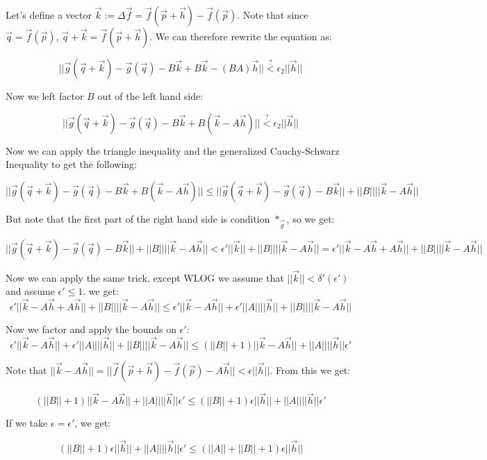 \documentclass[11 pt, twoside]{article}
\begin{document}
Let's define a vector $\vec{k} := \Delta \vec{f} = \vec{f}(\vec{p} + \vec{h}) -
\vec{f}(\vec{p})$. Note that since $\vec{q} = \vec{f}(\vec{p})$, $\vec{q} +
\vec{k} = \vec{f}(\vec{p} + \vec{h})$. We can therefore rewrite the equation as:

\[
||\vec{g}(\vec{q} + \vec{k}) - \vec{g}(\vec{q}) - B\vec{k} + B\vec{k} - (BA) \vec{h}||
\overset{?}{<} \epsilon_2 ||\vec{h}||
\]

Now we left factor $B$ out of the left hand side:

\[
||\vec{g}(\vec{q} + \vec{k}) - \vec{g}(\vec{q}) - B\vec{k} + B(\vec{k} - A
\vec{h})|| \overset{?}{<} \epsilon_2 ||\vec{h}||
\]

Now we can apply the triangle inequality and the generalized Cauchy-Schwarz
Inequality to get the following:

\[
||\vec{g}(\vec{q} + \vec{k}) - \vec{g}(\vec{q}) - B\vec{k} + B(\vec{k} - A
\vec{h})|| \leq ||\vec{g}(\vec{q} + \vec{k}) - \vec{g}(\vec{q}) -
B\vec{k}|| + ||B||||\vec{k} - A\vec{h}||
\]

But note that the first part of the right hand side is condition $*_{\vec{g}}$,
so we get:

\[
||\vec{g}(\vec{q} + \vec{k}) - \vec{g}(\vec{q}) - B\vec{k}|| + ||B||
||\vec{k} - A\vec{h}|| < \epsilon' ||\vec{k}|| + ||B||||\vec{k} -
A\vec{h}|| = \epsilon' ||\vec{k} - A\vec{h} + A\vec{h}|| + ||B||
||\vec{k} - A\vec{h}||
\]

Now we can apply the same trick, except WLOG we assume that $||\vec{k}|| <
\delta'(\epsilon')$ and assume $\epsilon' \leq 1$.  we get:
\[
\epsilon' ||\vec{k} - A\vec{h} + A\vec{h}|| + ||B||
||\vec{k} - A\vec{h}|| \leq \epsilon' ||\vec{k} - A\vec{h}|| +
\epsilon'||A||||\vec{h}|| + ||B||||\vec{k} - A\vec{h}||
\]

Now we factor and apply the bounds on $\epsilon'$:
\[
\epsilon' ||\vec{k} - A\vec{h}|| +
\epsilon'||A||||\vec{h}|| + ||B||||\vec{k} - A\vec{h}|| \leq
(||B|| + 1) ||\vec{k} - A\vec{h}|| + ||A||||\vec{h}||\epsilon'
\]

Note that $||\vec{k} - A\vec{h}|| = ||\vec{f}(\vec{p} + \vec{h}) -
\vec{f}(\vec{p}) - A\vec{h}|| < \epsilon ||\vec{h}||$. From this we
get:

\[
(||B|| + 1) ||\vec{k} - A\vec{h}|| + ||A||||\vec{h}||\epsilon'
\leq (||B|| + 1) \epsilon ||\vec{h}|| + ||A||  ||\vec{h}||
\epsilon'
\]

If we take $\epsilon = \epsilon'$, we get:

\[
(||B|| + 1) \epsilon ||\vec{h}|| + ||A||  ||\vec{h}||
\epsilon' \leq (||A|| + ||B|| + 1) \epsilon ||\vec{h}||
\]
\end{document}
